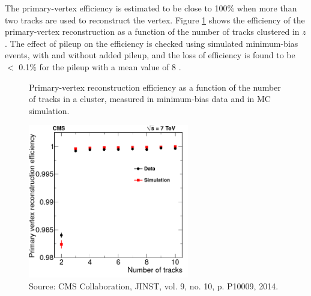 

 
The primary-vertex efficiency is estimated to be close to 100$\%$ when more than two tracks are used to reconstruct the vertex. Figure \ref{fig:PVeff} shows the efficiency of the primary-vertex reconstruction as a function of the number of tracks clustered in $z$. The effect of pileup on the efficiency is checked using simulated minimum-bias events, with and without added pileup, and the loss of efficiency is found to be $<$ 0.1$\%$ for the pileup with a mean value of 8 \cite{CMS:2010wta}.

\begin{figure}[!ht]
  \caption{
Primary-vertex reconstruction efficiency as a function of the number of tracks in a cluster, measured in minimum-bias data and in MC simulation.
}
  \centering
\includegraphics[width=7cm]{Chapter3_plots/PV_efficiency}
\caption*{Source: CMS Collaboration, JINST, vol. 9, no. 10, p. P10009, 2014.}
\label{fig:PVeff}
\end{figure}




